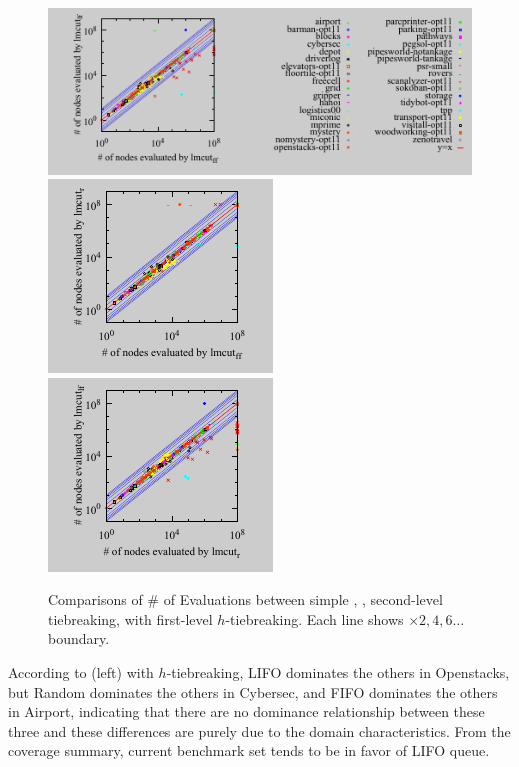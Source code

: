 \begin{figure}[htbp]
 \centering {}
 \includegraphics{tables/aaai16-5min/aaai16prelim3/evaluated-lmcut_ff-lmcut_lf.pdf}
 \includegraphics{tables/aaai16-5min/aaai16prelim3/evaluated-nokey-lmcut_ff-lmcut_r.pdf}
 \includegraphics{tables/aaai16-5min/aaai16prelim3/evaluated-nokey-lmcut_r-lmcut_lf.pdf}
 \caption{Comparisons of \# of Evaluations between simple \lifo, \fifo,
 \ro second-level tiebreaking, with first-level $h$-tiebreaking. Each
 line shows $\times 2,4,6\ldots$ boundary.}  \label{f-h-eval}
\end{figure}

According to  (left) with $h$-tiebreaking, LIFO
dominates the others in Openstacks, but Random dominates the others in
Cybersec, and FIFO dominates the others in Airport, indicating that
there are no dominance relationship between these three and these
differences are purely due to the domain characteristics. From the
coverage summary, current benchmark set tends to be in favor of LIFO queue.

